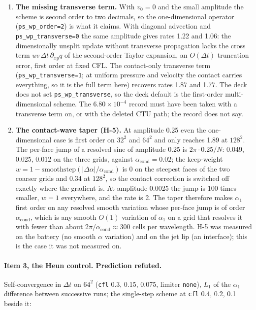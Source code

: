 \documentclass[11pt,a4paper]{article}
\newcommand{\code}[1]{\texttt{\small #1}}
\begin{document}
\begin{enumerate}[nosep]
\item \textbf{The missing transverse term.}  With $v_0 = 0$ and the small
      amplitude the scheme is second order to two decimals, so the
      one-dimensional operator (\code{ps\_wp\_order=2}) is what it claims.
      With diagonal advection and \code{ps\_wp\_transverse=0} the same
      amplitude gives rates 1.22 and 1.06: the dimensionally unsplit update
      without transverse propagation lacks the cross term
      $u v\,\Delta t\,\partial_{xy}q$ of the second-order Taylor expansion,
      an $O(\Delta t)$ truncation error, first order at fixed CFL.  The
      contact-only transverse term (\code{ps\_wp\_transverse=1}; at uniform
      pressure and velocity the contact carries everything, so it is the
      full term here) recovers rates 1.87 and 1.77.  The deck does not set
      \code{ps\_wp\_transverse}, so the deck default is the first-order
      multi-dimensional scheme.  The $6.80\times10^{-4}$ record must have
      been taken with a transverse term on, or with the deleted CTU path;
      the record does not say.
\item \textbf{The contact-wave taper (H-5).}  At amplitude 0.25 even the
      one-dimensional case is first order on $32^2$ and $64^2$ and only
      reaches 1.89 at $128^2$.  The per-face jump of a resolved sine of
      amplitude 0.25 is $2\pi\cdot0.25/N$: 0.049, 0.025, 0.012 on the three
      grids, against $\alpha_{\mathrm{cond}} = 0.02$; the keep-weight
      $w = 1 - \mathrm{smoothstep}(|\Delta\alpha|/\alpha_{\mathrm{cond}})$
      is 0 on the steepest faces of the two coarser grids and 0.34 at
      $128^2$, so the contact correction is switched off exactly where the
      gradient is.  At amplitude 0.0025 the jump is 100 times smaller,
      $w = 1$ everywhere, and the rate is 2.  The taper therefore makes
      $\alpha_1$ first order on any resolved smooth variation whose per-face
      jump is of order $\alpha_{\mathrm{cond}}$, which is any smooth
      $O(1)$ variation of $\alpha_1$ on a grid that resolves it with fewer
      than about $2\pi/\alpha_{\mathrm{cond}} \approx 300$ cells per
      wavelength.  H-5 was measured on the battery (no smooth $\alpha$
      variation) and on the jet lip (an interface); this is the case it
      was not measured on.
\end{enumerate}

\paragraph{Item 3, the Heun control.  Prediction refuted.}
Self-convergence in $\Delta t$ on $64^2$ (\code{cfl} 0.3, 0.15, 0.075,
limiter \code{none}), $L_1$ of the $\alpha_1$ difference between successive
runs; the single-step scheme at \code{cfl} 0.4, 0.2, 0.1 beside it:
\end{document}
